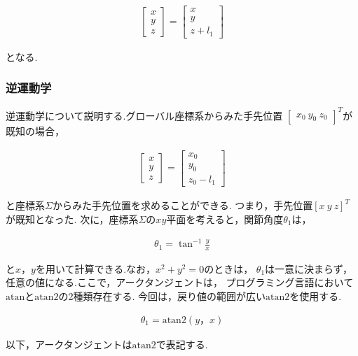 \begin{align}
  \begin{bmatrix}
    x \\
    y \\
    z
  \end{bmatrix}
  = 
  \begin{bmatrix}
    x \\
    y \\
    z + l_1
  \end{bmatrix} \tag{2.3}
\end{align}

となる.

\subsubsection{逆運動学}
逆運動学について説明する.グローバル座標系からみた手先位置
$\begin{bmatrix} x_0 \ y_0 \ z_0 \end{bmatrix}^T$が既知の場合，

\begin{align}
  \begin{bmatrix} x \\ y \\ z \end{bmatrix} = \begin{bmatrix} x_0 \\ y_0 \\ z_0 - l_1 \end{bmatrix} \tag{2.4}
\end{align}

と座標系$\Sigma$からみた手先位置を求めることができる.
つまり，手先位置$[x \ y \ z]^T$が既知となった.
次に，座標系$\Sigma$の$xy$平面を考えると，関節角度$\theta_1$は，

\begin{align}
  \theta_1 = \tan^{-1} \frac{y}{x} \tag{2.5}
\end{align}

と$x， y$を用いて計算できる.なお，$x^2 + y^2 = 0$のときは，
$\theta_1$は一意に決まらず，任意の値になる.ここで，アークタンジェントは，
プログラミング言語において$\text{atan}$と$\text{atan2}$の2種類存在する.
今回は，戻り値の範囲が広い$\text{atan2}$を使用する.

\begin{align}
  \theta_1 = \text{atan2}(y， x) \tag{2.6}
\end{align}

以下，アークタンジェントは$\text{atan2}$で表記する.

